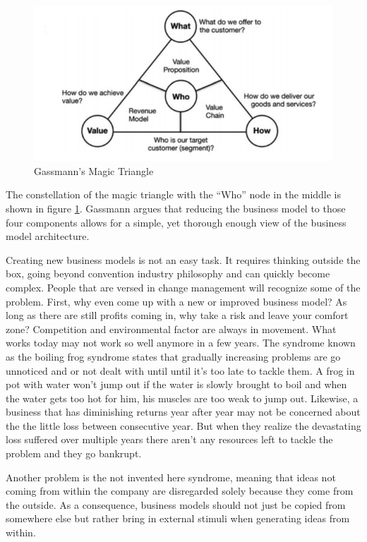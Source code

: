 		\begin{figure}[ht]
		    \begin{center}
		    \includegraphics[scale=0.6]{Talk11/Figure1.png}
		    \end{center}
		    \caption{Gassmann's Magic Triangle}
		    \label{Magic Triangle}
		\end{figure}
		The constellation of the magic triangle with the ``Who'' node in the middle is shown in figure \ref{Magic Triangle}.
		Gassmann argues that reducing the business model to those four components allows for a simple, yet thorough enough view of the business model architecture.

		Creating new business models is not an easy task. It requires thinking outside the box, going beyond convention industry philosophy and can quickly become complex. People that are versed in change management will recognize some of the problem. First, why even come up with a new or improved business model? As long as there are still profits coming in, why take a risk and leave your comfort zone? Competition and environmental factor are always in movement. What works today may not work so well anymore in a few years. The syndrome known as the boiling frog syndrome states that gradually increasing problems are go unnoticed and or not dealt with until until it's too late to tackle them. A frog in pot with water won't jump out if the water is slowly brought to boil and when the water gets too hot for him, his muscles are too weak to jump out. Likewise, a business that has diminishing returns year after year may not be concerned about the the little loss between consecutive year. But when they realize the devastating loss suffered over multiple years there aren't any resources left to tackle the problem and they go bankrupt.

		Another problem is the not invented here syndrome, meaning that ideas not coming from within the company are disregarded solely because they come from the outside. As a consequence, business models should not just be copied from somewhere else but rather bring in external stimuli when generating ideas from within.

